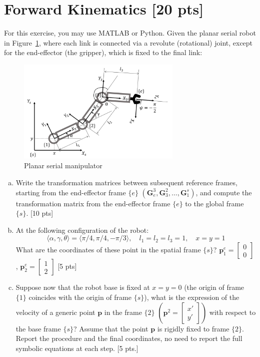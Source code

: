 \section{Forward Kinematics [20 pts]}
For this exercise, you may use MATLAB or Python. Given the planar serial robot in Figure~\ref{fig:planar}, where each link is connected via a revolute (rotational) joint, except for the end-effector (the gripper), which is fixed to the final link:
\begin{figure}[h!]
    \centering
    \includegraphics[width=0.7\textwidth]{img/planar.png}
    \caption{Planar serial manipulator}
    \label{fig:planar}
\end{figure}
\begin{enumerate}[(a)]  %
\item Write the transformation matrices between subsequent reference frames, starting from the end-effector frame $\{e\}$ $(\mathbf{G}_e^3,\mathbf{G}_3^2,\dots,\mathbf{G}_1^s)$, and compute the transformation matrix from the end-effector frame $\{e\}$ to the global frame $\{s\}$. [10 pts]
\item At the following configuration of the robot:
\begin{equation*}
    \langle \alpha,\gamma,\theta\rangle=\langle \pi/4,\pi/4,-\pi/3\rangle, \quad l_1=l_2=l_3=1,\quad x=y=1
\end{equation*}
What are the coordinates of these point in the spatial frame $\{s\}$? $\mathbf{p}^e_1=\begin{bmatrix}
    0 \\0
\end{bmatrix}$, $\mathbf{p}^e_2=\begin{bmatrix}
    1 \\2
\end{bmatrix}$ [5 pts]
\item 	Suppose now that the robot base is fixed at $x=y=0$ (the origin of frame $\{1\}$ coincides with the origin of frame $\{s\}$), what is the expression of the velocity of a generic point $\mathbf{p}$ in the frame $\{2\}$ $(\mathbf{p}^2=\begin{bmatrix}
    x'\\y'
\end{bmatrix})$ with respect to the base frame $\{s\}$? Assume that the point $\mathbf{p}$ is rigidly fixed to frame $\{2\}$. Report the procedure and the final coordinates, no need to report the full symbolic equations at each step. [5 pts.]
\end{enumerate}